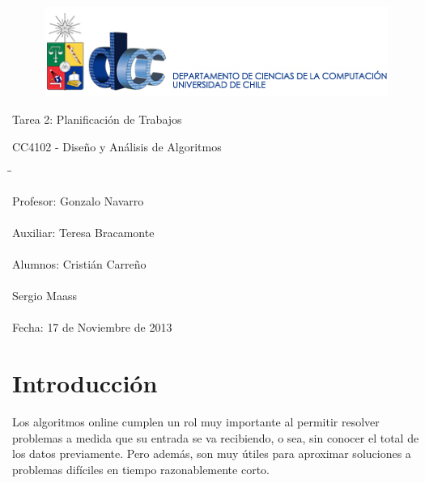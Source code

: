 \documentclass[12pt,letterpaper]{article}
\begin{document}
\begin{titlepage}
\begin{figure}[ht]
\includegraphics[scale=1]{logo_departamento.eps}
\label{DCC}
\vspace{1cm}
\end{figure}
\begin{center}
\vspace{4cm} {\Huge Tarea 2: Planificación de Trabajos}

\vspace{1cm} {\Large CC4102 - Diseño y Análisis de Algoritmos}
\vspace{7.5cm}
\end{center}

\begin{tabbing}
\hspace*{7cm}\=\hspace*{3.5cm}\= \kill

\> {\large Profesor:} 	\> 	{\large Gonzalo Navarro} \\ \\
\> {\large Auxiliar:}	\> 	{\large Teresa Bracamonte} \\ \\
\> {\large Alumnos:}	\> 	{\large Cristián Carreño} \\ \\
\> {\large } 			\> 	{\large Sergio Maass} \\ \\
\> {\large Fecha:} 		\> 	{\large 17 de Noviembre de 2013}
\end{tabbing}

\end{titlepage}

\newpage

\section{Introducción}
	Los algoritmos online cumplen un rol muy importante al permitir resolver problemas a medida que su entrada se va recibiendo, o sea, sin conocer el total de los datos previamente. Pero además, son muy útiles para aproximar soluciones a problemas difíciles en tiempo razonablemente corto. \\
	
\end{document}
